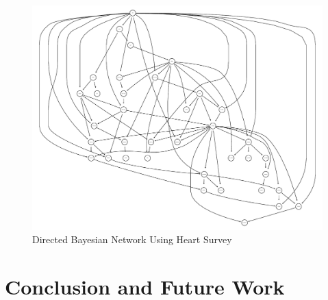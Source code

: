 \documentclass[conference]{IEEEtran}
\begin{document}
\begin{figure}[!ht]
\centering
\includegraphics[width=\textwidth]{bn_heartsurvey.pdf}
\caption{Directed Bayesian Network Using Heart Survey}
\label{fig_heartsurvey}
\end{figure}

\section{Conclusion and Future Work}

{}





\end{document}
